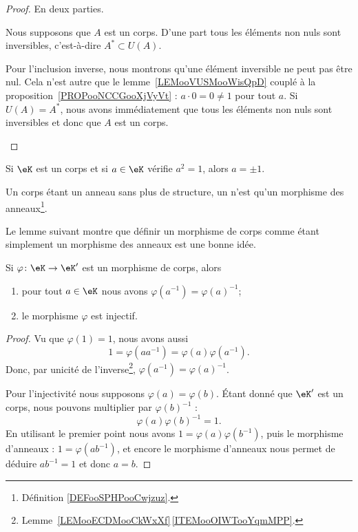 \begin{proof}
	En deux parties.
	\begin{subproof}
		Nous supposons que \( A\) est un corps. D'une part tous les éléments non nuls sont inversibles, c'est-à-dire \( A^*\subset U(A)\).

		Pour l'inclusion inverse, nous montrons qu'une élément inversible ne peut pas être nul. Cela n'est autre que le lemme~\ref{LEMooVUSMooWisQpD} couplé à la proposition~\ref{PROPooNCCGooXjVyVt} : \( a\cdot 0=0\neq 1\) pour tout \( a\).
		Si \( U(A)=A^*\), nous avons immédiatement que tous les éléments non nuls sont inversibles et donc que \( A\) est un corps.
	\end{subproof}
\end{proof}

\begin{lemma}       \label{LEMooJNIBooAURhrt}
	Si \( \eK\) est un corps et si \( a\in \eK\) vérifie \( a^2=1\), alors \( a=\pm 1\).
\end{lemma}

\begin{definition}
	Un corps étant un anneau sans plus de structure, un  n'est qu'un morphisme des anneaux\footnote{Définition \ref{DEFooSPHPooCwjzuz}.}.
\end{definition}

Le lemme suivant montre que définir un morphisme de corps comme étant simplement un morphisme des anneaux est une bonne idée.
\begin{lemma}       \label{LEMooWBOPooZnsZgQ}
	Si \( \varphi\colon \eK\to \eK'\) est un morphisme de corps, alors
	\begin{enumerate}
		\item
		      pour tout \( a\in \eK\) nous avons \( \varphi(a^{-1})=\varphi(a)^{-1}\);
		\item
		      le morphisme \( \varphi\) est injectif.
	\end{enumerate}
\end{lemma}

\begin{proof}
	Vu que \( \varphi(1)=1\), nous avons aussi
	\begin{equation}
		1=\varphi(aa^{-1})=\varphi(a)\varphi(a^{-1}).
	\end{equation}
	Donc, par unicité de l'inverse\footnote{Lemme~\ref{LEMooECDMooCkWxXf}\,\ref{ITEMooOIWTooYqmMPP}.}, \( \varphi(a^{-1})=\varphi(a)^{-1}\).

	Pour l'injectivité nous supposons \( \varphi(a)=\varphi(b)\). Étant donné que \( \eK'\) est un corps, nous pouvons multiplier par \( \varphi(b)^{-1}\) :
	\begin{equation}
		\varphi(a)\varphi(b)^{-1}=1.
	\end{equation}
	En utilisant le premier point nous avons \( 1=\varphi(a)\varphi(b^{-1})\), puis le morphisme d'anneaux : \( 1=\varphi(ab^{-1})\), et encore le morphisme d'anneaux nous permet de déduire \( ab^{-1}=1\) et donc \(a=b\).
\end{proof}





